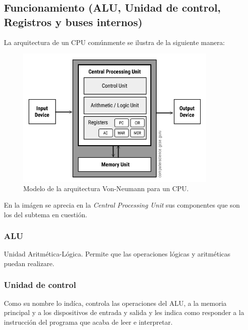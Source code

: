 \documentclass[letterpaper, 12pt]{article}
\begin{document}
\begin{justify}
        \subsection{Funcionamiento (ALU, Unidad de control, Registros y buses internos)}
        \justify
        La arquitectura de un CPU comúnmente se ilustra de la siguiente manera:
        \begin{figure}[H]
            \centering
            \includegraphics[width=10cm,height=7cm]{CPU.jpg}
            \caption{Modelo de la arquitectura Von-Neumann para un CPU.}
        \end{figure}
        \justify
        En la imágen se aprecia en la \emph{Central Processing Unit} sus componentes que son los del subtema en cuestión.
        \subsubsection*{ALU}
        \justify
        Unidad Aritmética-Lógica. Permite que las operaciones lógicas y aritméticas puedan realizare.
        \subsubsection*{Unidad de control}
        \justify
        Como su nombre lo indíca, controla las operaciones del ALU, a la memoria principal y a los dispositivos de entrada y salida
        y les indica como responder a la instrucción del programa que acaba de leer e interpretar.

\end{justify}
\end{document}
